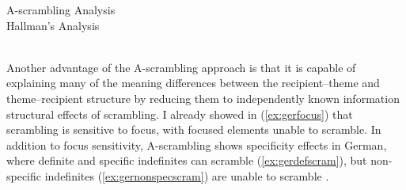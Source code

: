 \begin{exe}
\ex \label{ex:comparison-trees}
\begin{xlist}
\ex A-scrambling Analysis \\
\ex Hallman's Analysis \\
\\
\end{xlist}
\end{exe}%

Another advantage of the A-scrambling approach is that it is capable of explaining many of the meaning differences between the recipient--theme and theme--recipient structure by reducing them to independently known information structural effects of scrambling. I already showed in (\ref{ex:gerfocus}) that scrambling is sensitive to focus, with focused elements unable to scramble. In addition to focus sensitivity, A-scrambling shows specificity effects in German, where definite and specific indefinites can scramble (\ref{ex:gerdefscram}), but non-specific indefinites (\ref{ex:gernonspecscram}) are unable to scramble \citep{Mahajan.1990,Diesing.1992,Diesing.1996,dehoop.1996}.


